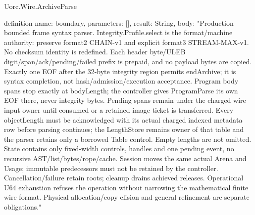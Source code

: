 \begin{lexlean}{Uorc.Wire.ArchiveParse}
\begin{semanticmodule}
definition{
  name: boundary,
  parameters: [],
  result: String,
  body: "Production bounded frame syntax parser. Integrity.Profile.select is the format/machine authority: preserve format2 CHAIN-v1 and explicit format3 STREAM-MAX-v1. No checksum identity is redefined. Each header byte/ULEB digit/span/ack/pending/failed prefix is prepaid, and no payload bytes are copied. Exactly one EOF after the 32-byte integrity region permits endArchive; it is syntax completion, not hash/admission/execution acceptance. Program body spans stop exactly at bodyLength; the controller gives ProgramParse its own EOF there, never integrity bytes. Pending spans remain under the charged wire input owner until consumed or a retained image ticket is transferred. Every objectLength must be acknowledged with its actual charged indexed metadata row before parsing continues; the LengthStore remains owner of that table and the parser retains only a borrowed Table control. Empty lengths are not omitted. State contains only fixed-width controls, handles and one pending event, no recursive AST/list/bytes/rope/cache. Session moves the same actual Arena and Usage; immutable predecessors must not be retained by the controller. Cancellation/failure retain roots; cleanup drains achieved releases. Operational U64 exhaustion refuses the operation without narrowing the mathematical finite wire format. Physical allocation/copy elision and general refinement are separate obligations."
}


\end{semanticmodule}
\end{lexlean}
